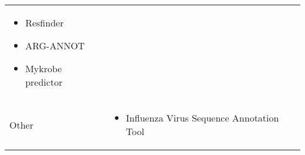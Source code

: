 \begin{tabular}{l l}
\begin{minipage}[t]{5cm}
    \raggedright
    \begin{itemize}[noitemsep]
    \item Resfinder
    \item ARG-ANNOT
    \item Mykrobe predictor
    \end{itemize}
    \smallskip
  \end{minipage}
  \\
  \-\tabindent Other &
  \begin{minipage}[t]{5cm}
    \raggedright
    \begin{itemize}[noitemsep]
    \item Influenza Virus Sequence Annotation Tool
    \end{itemize}
    \smallskip
  \end{minipage}
  \\
  \bottomrule
\end{tabular}